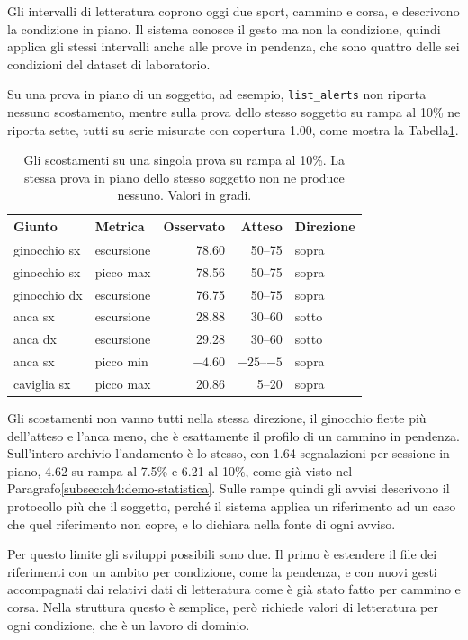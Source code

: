 Gli intervalli di letteratura coprono oggi due sport, cammino e corsa, e
descrivono la condizione in piano. Il sistema conosce il gesto ma non la
condizione, quindi applica gli stessi intervalli anche alle prove in pendenza, che
sono quattro delle sei condizioni del dataset di laboratorio\cite{vielemeyer2026}.

Su una prova in piano di un soggetto, ad esempio, \texttt{list\_alerts} non
riporta nessuno scostamento, mentre sulla prova dello stesso soggetto su rampa al
10\% ne riporta sette, tutti su serie misurate con copertura 1.00, come mostra la
Tabella\ref{tab:ch6:rampa}.

\begin{table}[htbp]
\centering
\caption{Gli scostamenti su una singola prova su rampa al 10\%. La stessa prova
in piano dello stesso soggetto non ne produce nessuno. Valori in gradi.}
\label{tab:ch6:rampa}
\begin{tabular}{llrrl}
\toprule
\textbf{Giunto} & \textbf{Metrica} & \textbf{Osservato} &
  \textbf{Atteso} & \textbf{Direzione} \\
\midrule
ginocchio sx & escursione  & 78.60 & 50--75  & sopra \\
ginocchio sx & picco max   & 78.56 & 50--75  & sopra \\
ginocchio dx & escursione  & 76.75 & 50--75  & sopra \\
anca sx      & escursione  & 28.88 & 30--60  & sotto \\
anca dx      & escursione  & 29.28 & 30--60  & sotto \\
anca sx      & picco min   & $-4.60$ & $-25$--$-5$ & sopra \\
caviglia sx  & picco max   & 20.86 & 5--20   & sopra \\
\bottomrule
\end{tabular}
\end{table}

Gli scostamenti non vanno tutti nella stessa direzione, il ginocchio flette più
dell'atteso e l'anca meno, che è esattamente il profilo di un cammino in pendenza.
Sull'intero archivio l'andamento è lo stesso, con 1.64 segnalazioni per sessione
in piano, 4.62 su rampa al 7.5\% e 6.21 al 10\%, come già visto nel
Paragrafo\ref{subsec:ch4:demo-statistica}. Sulle rampe quindi gli avvisi
descrivono il protocollo più che il soggetto, perché il sistema applica un
riferimento ad un caso che quel riferimento non copre, e lo dichiara nella fonte
di ogni avviso.

Per questo limite gli sviluppi possibili sono due. Il primo è estendere il file dei riferimenti con
un ambito per condizione, come la pendenza, e con nuovi gesti accompagnati dai
relativi dati di letteratura come è già stato fatto per cammino e corsa. Nella
struttura questo è semplice, però richiede valori di letteratura per ogni
condizione, che è un lavoro di dominio.

